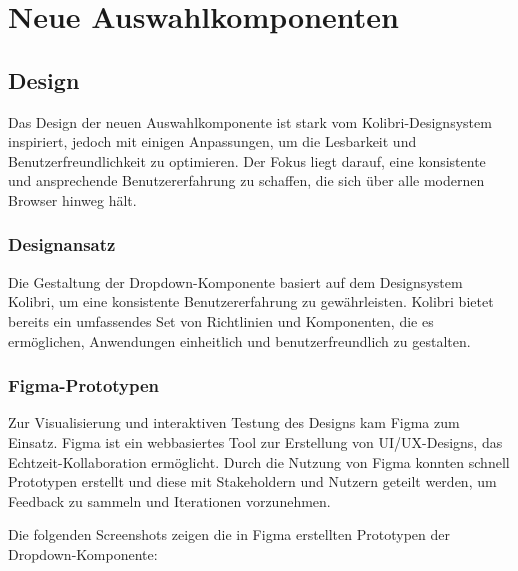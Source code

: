 \chapter{Neue Auswahlkomponenten}


\section{Design}

Das Design der neuen Auswahlkomponente ist stark vom Kolibri-Designsystem inspiriert, jedoch mit einigen Anpassungen, um die Lesbarkeit und Benutzerfreundlichkeit zu optimieren. 
Der Fokus liegt darauf, eine konsistente und ansprechende Benutzererfahrung zu schaffen, die sich über alle modernen Browser hinweg hält.


\subsection{Designansatz}

Die Gestaltung der Dropdown-Komponente basiert auf dem Designsystem Kolibri, um eine konsistente Benutzererfahrung zu gewährleisten. 
Kolibri bietet bereits ein umfassendes Set von Richtlinien und Komponenten, die es ermöglichen, Anwendungen einheitlich und benutzerfreundlich zu gestalten.





\subsection{Figma-Prototypen}
 
Zur Visualisierung und interaktiven Testung des Designs kam Figma zum Einsatz. 
Figma ist ein webbasiertes Tool zur Erstellung von UI/UX-Designs, das Echtzeit-Kollaboration ermöglicht. 
Durch die Nutzung von Figma konnten schnell Prototypen erstellt und diese mit Stakeholdern und Nutzern geteilt werden, um Feedback zu sammeln und Iterationen vorzunehmen.
 
Die folgenden Screenshots zeigen die in Figma erstellten Prototypen der Dropdown-Komponente:
 
